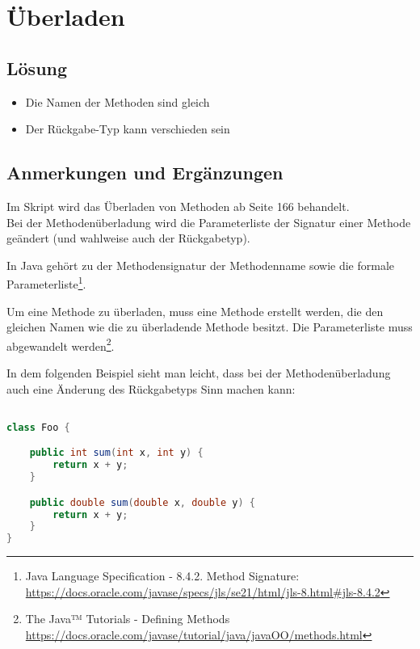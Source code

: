 \chapter{Überladen}\label{ueberladen}

\section*{Lösung}

\begin{itemize}
    \item Die Namen der Methoden sind gleich
    \item Der Rückgabe-Typ kann verschieden sein
\end{itemize}


\section*{Anmerkungen und Ergänzungen}

Im Skript wird das Überladen von Methoden ab Seite 166 behandelt.\\


Bei der Methodenüberladung wird die Parameterliste der Signatur einer Methode geändert (und wahlweise auch der Rückgabetyp).

In Java gehört zu der Methodensignatur der Methodenname sowie die formale Parameterliste\footnote {
    Java Language Specification - 8.4.2. Method Signature: \url{https://docs.oracle.com/javase/specs/jls/se21/html/jls-8.html#jls-8.4.2}
}.

Um eine Methode zu überladen, muss eine Methode erstellt werden, die den gleichen Namen wie die zu überladende Methode besitzt.
Die Parameterliste muss abgewandelt werden\footnote{The Java™ Tutorials - Defining Methods \url{https://docs.oracle.com/javase/tutorial/java/javaOO/methods.html}}.

In dem folgenden Beispiel sieht man leicht, dass bei der Methodenüberladung auch eine Änderung des Rückgabetyps Sinn machen kann:

\begin{lstlisting}[language=java]

class Foo {

    public int sum(int x, int y) {
        return x + y;
    }

    public double sum(double x, double y) {
        return x + y;
    }
}

\end{lstlisting}

